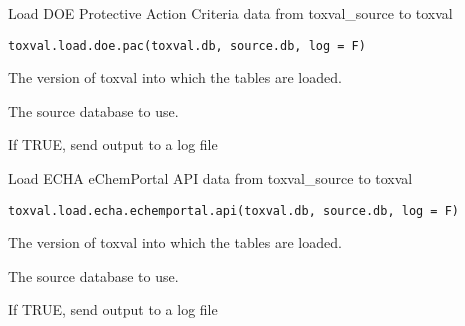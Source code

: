 \documentclass[letterpaper]{book}
\begin{document}
%
\begin{Description}\relax
Load DOE Protective Action Criteria data from toxval\_source to toxval
\end{Description}
%
\begin{Usage}
\begin{verbatim}
toxval.load.doe.pac(toxval.db, source.db, log = F)
\end{verbatim}
\end{Usage}
%
\begin{Arguments}
\begin{ldescription}
\item[\code{toxval.db}] The version of toxval into which the tables are loaded.

\item[\code{source.db}] The source database to use.

\item[\code{log}] If TRUE, send output to a log file
\end{ldescription}
\end{Arguments}
%
\begin{Description}\relax
Load ECHA eChemPortal API data from toxval\_source to toxval
\end{Description}
%
\begin{Usage}
\begin{verbatim}
toxval.load.echa.echemportal.api(toxval.db, source.db, log = F)
\end{verbatim}
\end{Usage}
%
\begin{Arguments}
\begin{ldescription}
\item[\code{toxval.db}] The version of toxval into which the tables are loaded.

\item[\code{source.db}] The source database to use.

\item[\code{log}] If TRUE, send output to a log file
\end{ldescription}
\end{Arguments}
\end{document}

